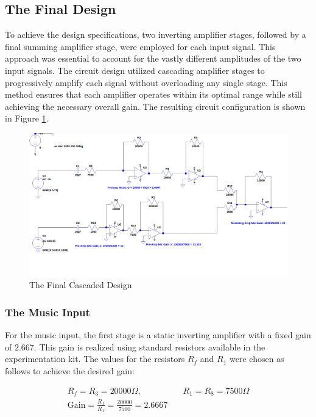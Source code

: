 \documentclass[12pt]{article}
\begin{document}
\subsection{The Final Design}
To achieve the design specifications, two inverting amplifier stages, followed by a final summing amplifier stage, were employed for each input signal. This approach was essential to account for the vastly different amplitudes of the two input signals. The circuit design utilized cascading amplifier stages to progressively amplify each signal without overloading any single stage. This method ensures that each amplifier operates within its optimal range while still achieving the necessary overall gain. The resulting circuit configuration is shown in Figure \ref{fig:fullcircuit}.

\begin{figure}[H]
	\centering
	\includegraphics[width=16cm]{dp_03}
	\caption{The Final Cascaded Design}
	\label{fig:fullcircuit}
\end{figure}

\subsubsection{The Music Input}
For the music input, the first stage is a static inverting amplifier with a fixed gain of $2.667$. This gain is realized using standard resistors available in the experimentation kit. The values for the resistors $R_f$ and $R_1$ were chosen as follows to achieve the desired gain:

\begin{align*}
	R_f = R_3 = 20000\Omega, \quad & \quad R_1 = R_8 = 7500\Omega \\
	\text{Gain} = \frac{R_f}{R_1} = \frac{20000}{7500} = 2.6667
\end{align*}
\end{document}
